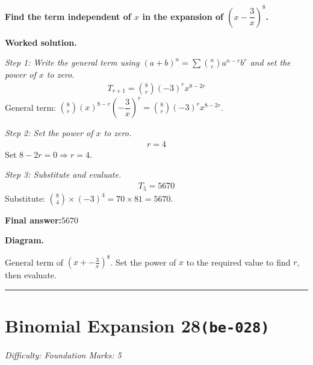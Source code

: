 \documentclass[11pt]{article}
\newcommand{\question}[1]{\par\medskip\noindent\textbf{#1}\par}
\begin{document}
\question{Find the term independent of \( x \) in the expansion of \( \left(x - \dfrac{3}{x}\right)^8 \).}

\textbf{Worked solution.}

\textit{Step 1: Write the general term using \((a+b)^n = \sum \binom{n}{r} a^{n-r} b^r\) and set the power of \(x\) to zero.}
\[\begin{gathered}
T_{r+1} = \binom{8}{r}(-3)^r x^{8-2r}
\end{gathered}\]
General term: \( \binom{8}{r}(x)^{8-r}\left(-\dfrac{3}{x}\right)^r = \binom{8}{r}(-3)^r x^{8-2r} \).

\textit{Step 2: Set the power of \(x\) to zero.}
\[\begin{gathered}
r = 4
\end{gathered}\]
Set \(8 - 2r = 0 \Rightarrow r = 4\).

\textit{Step 3: Substitute and evaluate.}
\[\begin{gathered}
T_5 = 5670
\end{gathered}\]
Substitute: \(\binom{8}{4} \times (-3)^4 = 70 \times 81 = 5670\).

\begin{answerbox}
\textbf{Final answer:}\quad \(\displaystyle 5670\)
\end{answerbox}
\textbf{Diagram.}

\begin{center}
\end{center}
\small General term of $\left(x+-\frac{3}{x}\right)^{8}$. Set the power of $x$ to the required value to find $r$, then evaluate.\normalsize

\medskip\hrule

\section*{Binomial Expansion 28\quad\small\texttt{(be-028)}}
\textit{Difficulty: Foundation \quad\textbar\quad Marks: 5}
\end{document}
